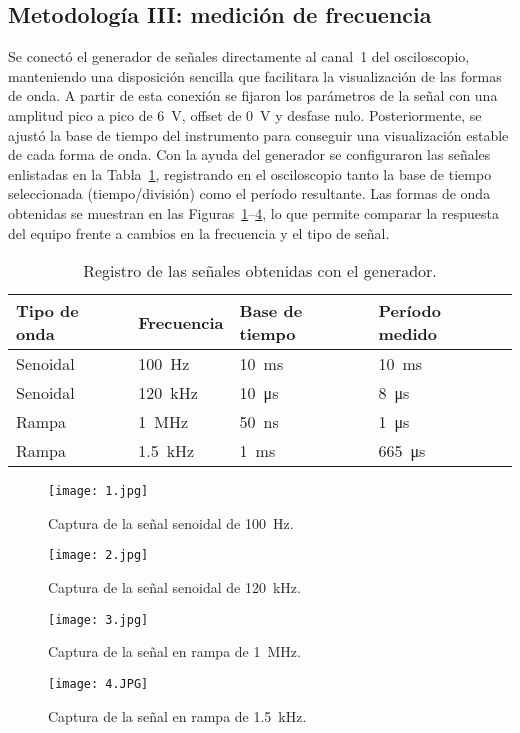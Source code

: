 \documentclass[conference]{IEEEtran} %
\begin{document}
\subsection{Metodología III: medición de frecuencia}
Se conectó el generador de señales directamente al canal~1 del osciloscopio, manteniendo una disposición sencilla que facilitara la visualización de las formas de onda. A partir de esta conexión se fijaron los parámetros de la señal con una amplitud pico a pico de \SI{6}{\volt}, offset de \SI{0}{\volt} y desfase nulo. Posteriormente, se ajustó la base de tiempo del instrumento para conseguir una visualización estable de cada forma de onda.
Con la ayuda del generador se configuraron las señales enlistadas en la Tabla~\ref{tab:frecuencia}, registrando en el osciloscopio tanto la base de tiempo seleccionada (tiempo/división) como el período resultante. Las formas de onda obtenidas se muestran en las Figuras~\ref{fig:frecuencia-senoidal-100hz}--\ref{fig:frecuencia-rampa-1k5hz}, lo que permite comparar la respuesta del equipo frente a cambios en la frecuencia y el tipo de señal.%
\begin{table}[htbp]
    \centering
    \caption{Registro de las señales obtenidas con el generador.}
    \label{tab:frecuencia}
    \begin{tabular}{@{}llll@{}}
        \toprule
        Tipo de onda & Frecuencia & Base de tiempo & Período medido \\ \midrule
        Senoidal & \SI{100}{\hertz} & \SI{10}{\milli\second} & \SI{10}{\milli\second} \\
        Senoidal & \SI{120}{\kilo\hertz} & \SI{10}{\micro\second} & \SI{8}{\micro\second} \\
        Rampa & \SI{1}{\mega\hertz} & \SI{50}{\nano\second} & \SI{1}{\micro\second} \\
        Rampa & \SI{1.5}{\kilo\hertz} & \SI{1}{\milli\second} & \SI{665}{\micro\second} \\
        \bottomrule
    \end{tabular}
\end{table}
\begin{figure}[htbp]
    \centering
    \texttt{[image: 1.jpg]}
    \caption{Captura de la señal senoidal de \SI{100}{\hertz}.}
    \label{fig:frecuencia-senoidal-100hz}
\end{figure}
\begin{figure}[htbp]
    \centering
    \texttt{[image: 2.jpg]}
    \caption{Captura de la señal senoidal de \SI{120}{\kilo\hertz}.}
    \label{fig:frecuencia-senoidal-120khz}
\end{figure}
\begin{figure}[htbp]
    \centering
    \texttt{[image: 3.jpg]}
    \caption{Captura de la señal en rampa de \SI{1}{\mega\hertz}.}
    \label{fig:frecuencia-rampa-1mhz}
\end{figure}
\begin{figure}[htbp]
    \centering
    \texttt{[image: 4.JPG]}
    \caption{Captura de la señal en rampa de \SI{1.5}{\kilo\hertz}.}
    \label{fig:frecuencia-rampa-1k5hz}
\end{figure}
\end{document}
